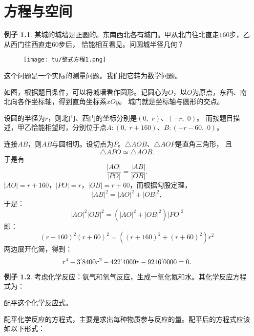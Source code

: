 \documentclass[12pt,UTF8]{ctexbook}
\newcommand{\dlim}[1]{^{\color{gray}\prime}#1}  %
\theoremstyle{definition}
\newtheorem{ex}{例子}[section]
\theoremstyle{plain}
\begin{document}
\chapter{方程与空间}

\begin{ex}
    某城的城墙是正圆的。东南西北各有城门。甲从北门往北直走$160$步，乙从西门往西直走$60$步后，
    恰能相互看见。问圆城半径几何？ %
\end{ex}

\begin{wrapfigure}[8]{r}{0.36\textwidth} %
    \vspace{-30pt}
    \flushright
    \texttt{[image: tu/整式方程1.png]}
\end{wrapfigure}

这个问题是一个实际的测量问题。我们把它转为数学问题。

如图，根据题目条件，可以将城墙看作圆形。记圆心为$O$，以$O$为原点，东西、南北向各作坐标轴，得到直角坐标系$xOy$。
城门就是坐标轴与圆形的交点。

设圆的半径为$r$，则北门、西门的坐标分别是$(0, \,\, r)$、$(-r, \,\, 0)$。
而按题目描述，甲乙恰能相望时，分别位于点$A:(0, \,\, r+160)$、$B:(-r-60, \,\, 0)$。

连接$AB$，则$AB$与圆相切。设切点为$P$。$\triangle AOB$、$\triangle AOP$是直角三角形，
且
$$ \triangle APO \simeq \triangle AOB.$$
于是有
$$ \frac{|AO|}{|PO|} = \frac{|AB|}{|OB|}.$$
$|AO| = r+160$，$|PO| = r$，$|OB| = r + 60$，而根据勾股定理，
$$ |AB|^2 = |AO|^2 + |OB|^2,$$
于是：
$$ |AO|^2 |OB|^2 = \left(|AO|^2 + |OB|^2\right) |PO|^2 $$
即：
$$ (r+160)^2 (r+60)^2 = \left((r+160)^2 + (r+60)^2\right) r^2 $$
两边展开化简，得到：
$$ r^4 - 3\dlim{8400} r^2 - 422\dlim{4000} r - 9216\dlim{0000} = 0. $$

\begin{ex}
  考虑化学反应：氨气和氧气反应，生成一氧化氮和水。其化学反应方程式为：

\begin{center}
\end{center}

  配平这个化学反应式。
\end{ex}

配平化学反应的方程式，主要是求出每种物质参与反应的量。配平后的方程式应该如以下形式：
\end{document}
